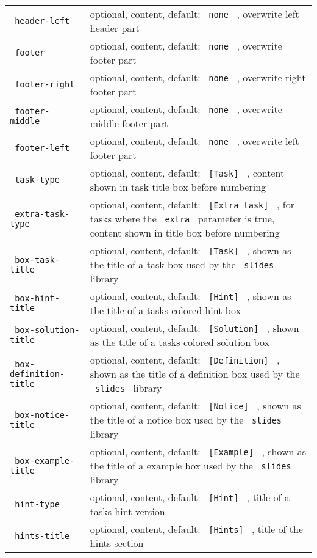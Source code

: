 \begin{longtable}[]{@{}ll@{}}
\texttt{\ header-left\ } & optional, content, default: \texttt{\ none\ }
, overwrite left header part \\
\texttt{\ footer\ } & optional, content, default: \texttt{\ none\ } ,
overwrite footer part \\
\texttt{\ footer-right\ } & optional, content, default:
\texttt{\ none\ } , overwrite right footer part \\
\texttt{\ footer-middle\ } & optional, content, default:
\texttt{\ none\ } , overwrite middle footer part \\
\texttt{\ footer-left\ } & optional, content, default: \texttt{\ none\ }
, overwrite left footer part \\
\texttt{\ task-type\ } & optional, content, default:
\texttt{\ {[}Task{]}\ } , content shown in task title box before
numbering \\
\texttt{\ extra-task-type\ } & optional, content, default:
\texttt{\ {[}Extra\ task{]}\ } , for tasks where the \texttt{\ extra\ }
parameter is true, content shown in title box before numbering \\
\texttt{\ box-task-title\ } & optional, content, default:
\texttt{\ {[}Task{]}\ } , shown as the title of a task box used by the
\texttt{\ slides\ } library \\
\texttt{\ box-hint-title\ } & optional, content, default:
\texttt{\ {[}Hint{]}\ } , shown as the title of a tasks colored hint
box \\
\texttt{\ box-solution-title\ } & optional, content, default:
\texttt{\ {[}Solution{]}\ } , shown as the title of a tasks colored
solution box \\
\texttt{\ box-definition-title\ } & optional, content, default:
\texttt{\ {[}Definition{]}\ } , shown as the title of a definition box
used by the \texttt{\ slides\ } library \\
\texttt{\ box-notice-title\ } & optional, content, default:
\texttt{\ {[}Notice{]}\ } , shown as the title of a notice box used by
the \texttt{\ slides\ } library \\
\texttt{\ box-example-title\ } & optional, content, default:
\texttt{\ {[}Example{]}\ } , shown as the title of a example box used by
the \texttt{\ slides\ } library \\
\texttt{\ hint-type\ } & optional, content, default:
\texttt{\ {[}Hint{]}\ } , title of a tasks hint version \\
\texttt{\ hints-title\ } & optional, content, default:
\texttt{\ {[}Hints{]}\ } , title of the hints section \\

\end{longtable}
